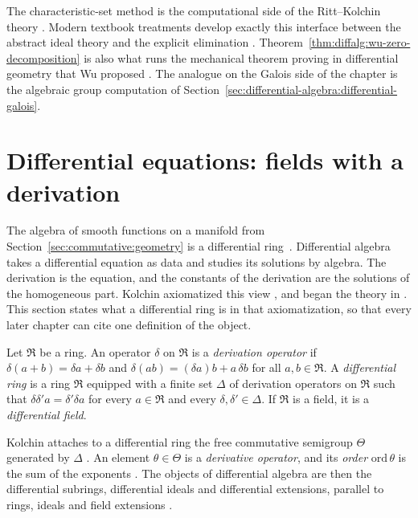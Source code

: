 The characteristic-set method is the computational side of the
Ritt--Kolchin theory \cite[pp.~175--184]{Wu1987RittConstructive}.
Modern textbook treatments \cite[pp.~245--261]{HubbardLundell2011}
develop exactly this interface between the abstract ideal theory and the
explicit elimination \cite[pp.~245--250]{HubbardLundell2011}.
Theorem~\ref{thm:diffalg:wu-zero-decomposition} is also what runs the
mechanical theorem proving in differential geometry that Wu proposed
\cite[pp.~175--184]{Wu1987RittConstructive}. The analogue on the Galois
side of the chapter is the algebraic group computation of
Section~\ref{sec:differential-algebra:differential-galois}.

\section{Differential equations: fields with a derivation}\label{sec:differential-algebra:differential-equations}

The algebra of smooth functions on a manifold from
Section~\ref{sec:commutative:geometry} is a differential ring~\cite[\S I.1]{Kolchin1973}. Differential
algebra takes a differential equation as data and studies its solutions by
algebra. The derivation is the equation, and the constants of the derivation
are the solutions of the homogeneous part. Kolchin axiomatized this view %
\cite{Kolchin1973}, and
began the theory in \cite[\S I.1]{Kolchin1973}. This section states what a
differential ring is in that axiomatization, so that every later chapter can
cite one definition of the object.

\begin{definition}\label{def:diffalg:kolchin-diff-ring}
Let $\mathfrak{R}$ be a ring. An operator $\delta$ on $\mathfrak{R}$ is a
\emph{derivation operator} if $\delta(a+b)=\delta a+\delta b$ and
$\delta(ab)=(\delta a)b+a\,\delta b$ for all $a,b\in\mathfrak{R}$. A
\emph{differential ring} is a ring $\mathfrak{R}$ equipped with a finite set
$\Delta$ of derivation operators on $\mathfrak{R}$ such that
$\delta\delta'a=\delta'\delta a$ for every $a\in\mathfrak{R}$ and every
$\delta,\delta'\in\Delta$. If $\mathfrak{R}$ is a field, it is a
\emph{differential field}.
\end{definition}

Kolchin attaches to a differential ring the free commutative semigroup
$\Theta$ generated by $\Delta$ \cite[\S I.1, p.~59]{Kolchin1973}. An element
$\theta\in\Theta$ is a \emph{derivative operator}, and its \emph{order}
$\mathrm{ord}\,\theta$ is the sum of the exponents
\cite[\S I.1, p.~59]{Kolchin1973}. The objects of
differential algebra are then the differential subrings, differential ideals
and differential extensions, parallel to rings, ideals and field extensions
\cite[\S I.1, p.~59]{Kolchin1973}.

